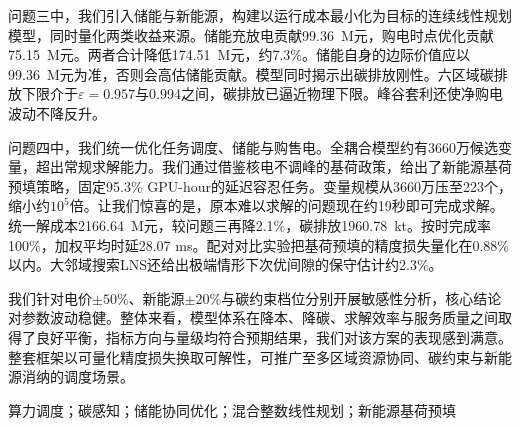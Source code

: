 问题三中，我们引入储能与新能源，构建以运行成本最小化为目标的连续线性规划模型，同时量化两类收益来源。储能充放电贡献99.36~M元，购电时点优化贡献75.15~M元。两者合计降低174.51~M元，约7.3\%。储能自身的边际价值应以99.36~M元为准，否则会高估储能贡献。模型同时揭示出碳排放刚性。六区域碳排放下限介于$\varepsilon{=}0.957$与0.994之间，碳排放已逼近物理下限。峰谷套利还使净购电波动不降反升。

问题四中，我们统一优化任务调度、储能与购售电。全耦合模型约有3660万候选变量，超出常规求解能力。我们通过借鉴核电不调峰的基荷政策，给出了新能源基荷预填策略，固定95.3\% GPU-hour的延迟容忍任务。变量规模从3660万压至223个，缩小约$10^5$倍。让我们惊喜的是，原本难以求解的问题现在约19秒即可完成求解。统一解成本2166.64~M元，较问题三再降2.1\%，碳排放1960.78~kt。按时完成率100\%，加权平均时延28.07 ms。配对对比实验把基荷预填的精度损失量化在0.88\%以内。大邻域搜索LNS还给出极端情形下次优间隙的保守估计约2.3\%。

我们针对电价$\pm50\%$、新能源$\pm20\%$与碳约束档位分别开展敏感性分析，核心结论对参数波动稳健。整体来看，模型体系在降本、降碳、求解效率与服务质量之间取得了良好平衡，指标方向与量级均符合预期结果，我们对该方案的表现感到满意。整套框架以可量化精度损失换取可解性，可推广至多区域资源协同、碳约束与新能源消纳的调度场景。

\vspace{1em}
\quad 算力调度；碳感知；储能协同优化；混合整数线性规划；新能源基荷预填